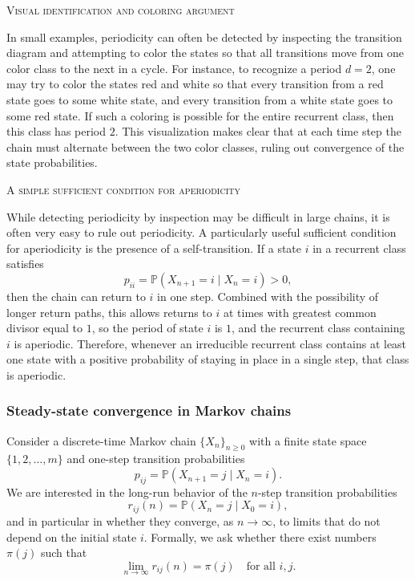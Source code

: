 \bigskip
\textsc{Visual identification and coloring argument}

In small examples, periodicity can often be detected by inspecting the transition diagram and attempting to color the states so that all transitions move from one color class to the next in a cycle.
For instance, to recognize a period \(d = 2\), one may try to color the states red and white so that every transition from a red state goes to some white state, and every transition from a white state goes to some red state.
If such a coloring is possible for the entire recurrent class, then this class has period \(2\).
This visualization makes clear that at each time step the chain must alternate between the two color classes, ruling out convergence of the state probabilities.

\bigskip
\textsc{A simple sufficient condition for aperiodicity}

While detecting periodicity by inspection may be difficult in large chains, it is often very easy to rule out periodicity.
A particularly useful sufficient condition for aperiodicity is the presence of a self-transition.
If a state \(i\) in a recurrent class satisfies
\[
p_{ii} = \mathbb{P}(X_{n+1} = i \mid X_n = i) > 0,
\]
then the chain can return to \(i\) in one step.
Combined with the possibility of longer return paths, this allows returns to \(i\) at times with greatest common divisor equal to \(1\), so the period of state \(i\) is \(1\), and the recurrent class containing \(i\) is aperiodic.
Therefore, whenever an irreducible recurrent class contains at least one state with a positive probability of staying in place in a single step, that class is aperiodic.

\subsubsection{Steady-state convergence in Markov chains}

Consider a discrete-time Markov chain \(\{X_n\}_{n \ge 0}\) with a finite state space \(\{1,2,\dots,m\}\) and one-step transition probabilities
\[
p_{ij}
=
\mathbb{P}(X_{n+1} = j \mid X_n = i).
\]
We are interested in the long-run behavior of the \(n\)-step transition probabilities
\[
r_{ij}(n)
=
\mathbb{P}(X_n = j \mid X_0 = i),
\]
and in particular in whether they converge, as \(n \to \infty\), to limits that do not depend on the initial state \(i\).
Formally, we ask whether there exist numbers \(\pi(j)\) such that
\[
\lim_{n \to \infty} r_{ij}(n) = \pi(j)
\quad
\text{for all } i, j.
\]

